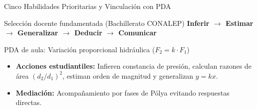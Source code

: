 \documentclass[spanish,aspectratio=1610,xcolor={dvipsnames,table}]{beamer}
\begin{document}
\begin{frame}{Cinco Habilidades Prioritarias y Vinculación con PDA}
  \begin{block}{Selección docente fundamentada (Bachillerato CONALEP)}
    \textbf{Inferir $\rightarrow$ Estimar $\rightarrow$ Generalizar $\rightarrow$ Deducir $\rightarrow$ Comunicar}
  \end{block}
  \vspace{0.2cm}
  \begin{block}{PDA de aula: Variación proporcional hidráulica ($F_2 = k\cdot F_1$)}
    \begin{itemize}
      \item \textbf{Acciones estudiantiles:} Infieren constancia de presión, calculan razones de área $(d_2/d_1)^2$, estiman orden de magnitud y generalizan $y = kx$.
      \item \textbf{Mediación:} Acompañamiento por fases de Pólya evitando respuestas directas.
    \end{itemize}
  \end{block}
\end{frame}
\end{document}
